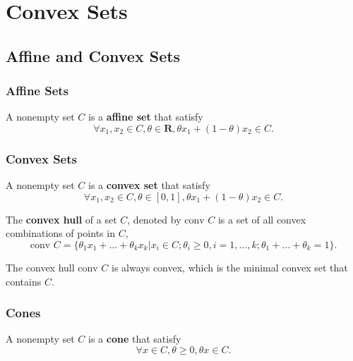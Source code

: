 \chapter{Convex Sets}

\section{Affine and Convex Sets}

\subsection{Affine Sets}

\begin{definition}
    A nonempty set $C$ is a \textbf{affine set} that satisfy $$\forall x_1,x_2\in C, \theta\in\mathbf{R}, \theta x_1+(1-\theta)x_2\in C.$$
\end{definition}

\subsection{Convex Sets}

\begin{definition}
    A nonempty set $C$ is a \textbf{convex set} that satisfy $$\forall x_1,x_2\in C,\theta\in[0,1], \theta x_1+(1-\theta)x_2\in C.$$
\end{definition}

\begin{definition}
    The \textbf{convex hull} of a set $C$, denoted by $\text{conv } C$ is a set of all convex combinations of points in $C$, $$\text{conv } C=\{\theta_1x_1+\ldots+\theta_kx_k|x_i\in C;\theta_i\geq 0,i=1,\ldots,k;\theta_1+\ldots+\theta_k=1\}.$$
\end{definition}

\begin{note}
    The convex hull $\text{conv } C$ is always convex, which is the minimal convex set that contains $C$.
\end{note}

\subsection{Cones}

\begin{definition}[Cone]
    A nonempty set $C$ is a \textbf{cone} that satisfy $$\forall x\in C,\theta\geq 0,\theta x\in C.$$
\end{definition}

